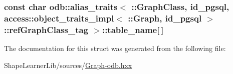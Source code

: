 \subsubsection[{table\+\_\+name}]{\setlength{\rightskip}{0pt plus 5cm}const char odb\+::alias\+\_\+traits$<$ \+::{\bf Graph\+Class}, id\+\_\+pgsql, access\+::object\+\_\+traits\+\_\+impl$<$ \+::{\bf Graph}, id\+\_\+pgsql $>$\+::ref\+Graph\+Class\+\_\+tag $>$\+::table\+\_\+name\mbox{[}$\,$\mbox{]}\hspace{0.3cm}{\ttfamily [static]}}\label{structodb_1_1alias__traits_3_01_1_1_graph_class_00_01id__pgsql_00_01access_1_1object__traits__im1cc89598874d63c16da0df475d829efe_a824c58d35c7ea67273be3aeca7bb19ee}


The documentation for this struct was generated from the following file\+:\begin{DoxyCompactItemize}
\item 
Shape\+Learner\+Lib/sources/\hyperlink{_graph-odb_8hxx}{Graph-\/odb.\+hxx}\end{DoxyCompactItemize}
